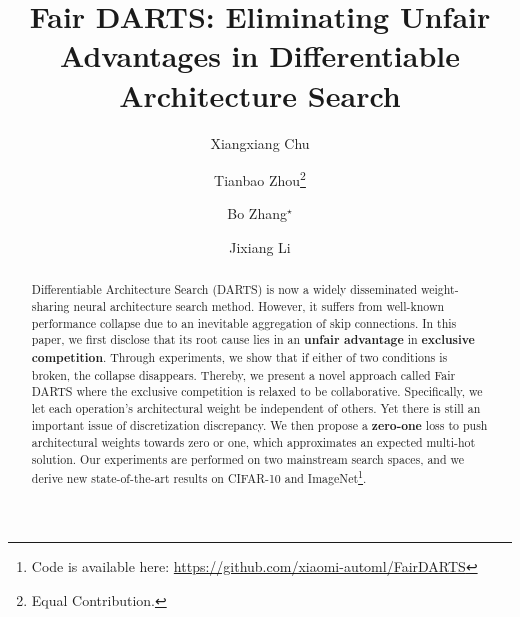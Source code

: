 \documentclass[runningheads]{llncs}
\begin{document}
\pagestyle{headings}
\mainmatter
\def\ECCVSubNumber{2382}  



\title{Fair DARTS: Eliminating Unfair Advantages in Differentiable Architecture Search}

\begin{comment}
\titlerunning{ECCV-20 submission ID \ECCVSubNumber} 
\authorrunning{ECCV-20 submission ID \ECCVSubNumber} 
\author{Anonymous ECCV submission}
\institute{Paper ID \ECCVSubNumber}
\end{comment}



\author{Xiangxiang Chu  \and
Tianbao Zhou\thanks{Equal Contribution.}  \and
Bo Zhang$^\star$  \and
Jixiang Li}


\maketitle


\begin{abstract}
Differentiable Architecture Search (DARTS) is now a widely disseminated weight-sharing neural architecture search method. However, it suffers from well-known performance collapse due to an inevitable aggregation of skip connections. In this paper, we first disclose that its root cause lies in an \textbf{unfair advantage} in  \textbf{exclusive competition}. Through experiments, we show that if either of two conditions is broken, the collapse disappears. Thereby, we present a novel approach called Fair DARTS where the exclusive competition is relaxed to  be collaborative. Specifically, we let each operation's architectural weight be independent of others. Yet there is still an important issue of discretization discrepancy. We then propose a \textbf{zero-one} loss to push architectural weights towards zero or one, which approximates an expected multi-hot solution. Our experiments are performed on two mainstream search spaces, and we derive new state-of-the-art results on CIFAR-10 and ImageNet\footnote{Code is available here: \url{https://github.com/xiaomi-automl/FairDARTS}}. 








\end{abstract}
\end{document}
